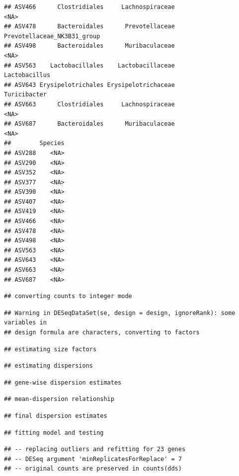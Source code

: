 \documentclass[]{article}
\begin{document}
\begin{verbatim}
## ASV466      Clostridiales     Lachnospiraceae                        <NA>
## ASV478      Bacteroidales      Prevotellaceae Prevotellaceae_NK3B31_group
## ASV498      Bacteroidales      Muribaculaceae                        <NA>
## ASV563    Lactobacillales    Lactobacillaceae               Lactobacillus
## ASV643 Erysipelotrichales Erysipelotrichaceae                Turicibacter
## ASV663      Clostridiales     Lachnospiraceae                        <NA>
## ASV687      Bacteroidales      Muribaculaceae                        <NA>
##        Species
## ASV288    <NA>
## ASV290    <NA>
## ASV352    <NA>
## ASV377    <NA>
## ASV390    <NA>
## ASV407    <NA>
## ASV419    <NA>
## ASV466    <NA>
## ASV478    <NA>
## ASV498    <NA>
## ASV563    <NA>
## ASV643    <NA>
## ASV663    <NA>
## ASV687    <NA>
\end{verbatim}

\begin{verbatim}
## converting counts to integer mode
\end{verbatim}

\begin{verbatim}
## Warning in DESeqDataSet(se, design = design, ignoreRank): some variables in
## design formula are characters, converting to factors
\end{verbatim}

\begin{verbatim}
## estimating size factors
\end{verbatim}

\begin{verbatim}
## estimating dispersions
\end{verbatim}

\begin{verbatim}
## gene-wise dispersion estimates
\end{verbatim}

\begin{verbatim}
## mean-dispersion relationship
\end{verbatim}

\begin{verbatim}
## final dispersion estimates
\end{verbatim}

\begin{verbatim}
## fitting model and testing
\end{verbatim}

\begin{verbatim}
## -- replacing outliers and refitting for 23 genes
## -- DESeq argument 'minReplicatesForReplace' = 7 
## -- original counts are preserved in counts(dds)
\end{verbatim}
\end{document}
